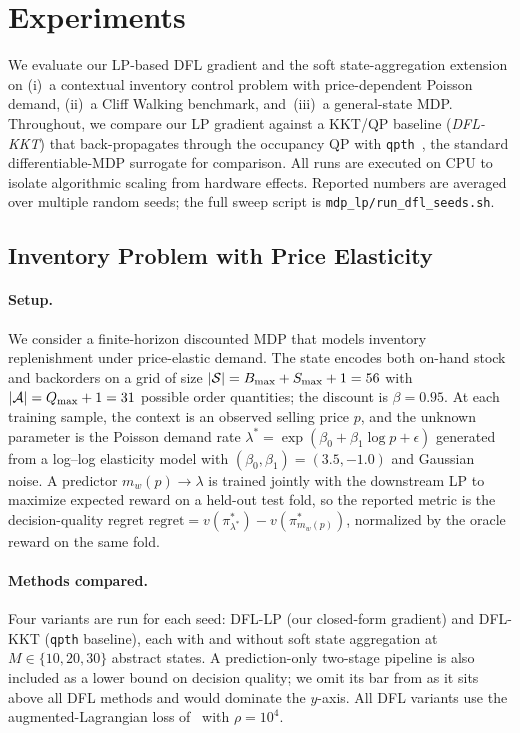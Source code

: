 \section{Experiments}
\label{sec:experiments}

We evaluate our LP-based DFL gradient and the soft state-aggregation extension on
(i)~a contextual inventory control problem with price-dependent Poisson demand,
(ii)~a Cliff Walking benchmark, and~(iii)~a general-state MDP.
Throughout, we compare our LP gradient against a KKT/QP baseline
(\emph{DFL-KKT}) that back-propagates through the occupancy QP with
\texttt{qpth}~\citep{amos2017optnet,wang2021learning}, the standard
differentiable-MDP surrogate for comparison.
All runs are executed on CPU to isolate algorithmic scaling from hardware
effects. Reported numbers are averaged over multiple random seeds; the full
sweep script is \texttt{mdp\_lp/run\_dfl\_seeds.sh}.

\subsection{Inventory Problem with Price Elasticity}
\label{sec:exp:inventory}

\paragraph{Setup.}
We consider a finite-horizon discounted MDP that models inventory replenishment
under price-elastic demand. The state encodes both on-hand stock and backorders
on a grid of size $|{\mathcal{S}}|=B_{\max}+S_{\max}+1=56$ with $|{\mathcal{A}}|=Q_{\max}+1=31$
possible order quantities; the discount is $\beta=0.95$.
At each training sample, the context is an observed selling price $p$, and the
unknown parameter is the Poisson demand rate $\lambda^{*}=\exp(\beta_{0}+\beta_{1}\log p + \epsilon)$
generated from a log--log elasticity model with $(\beta_{0},\beta_{1})=(3.5,-1.0)$
and Gaussian noise. A predictor $m_{w}(p)\!\to\!\lambda$ is trained jointly with
the downstream LP to maximize expected reward on a held-out test fold, so the
reported metric is the decision-quality regret
$\mathrm{regret}=v(\pi^{*}_{\lambda^{*}})-v(\pi^{*}_{m_{w}(p)})$,
normalized by the oracle reward on the same fold.

\paragraph{Methods compared.}
Four variants are run for each seed: DFL-LP (our closed-form gradient) and
DFL-KKT (\texttt{qpth} baseline), each with and without soft state aggregation at
$M\in\{10,20,30\}$ abstract states.
A prediction-only two-stage pipeline is also included as a lower bound on
decision quality; we omit its bar from  as it sits
above all DFL methods and would dominate the $y$-axis. All DFL variants use
the augmented-Lagrangian loss of~ with $\rho=10^{4}$.

